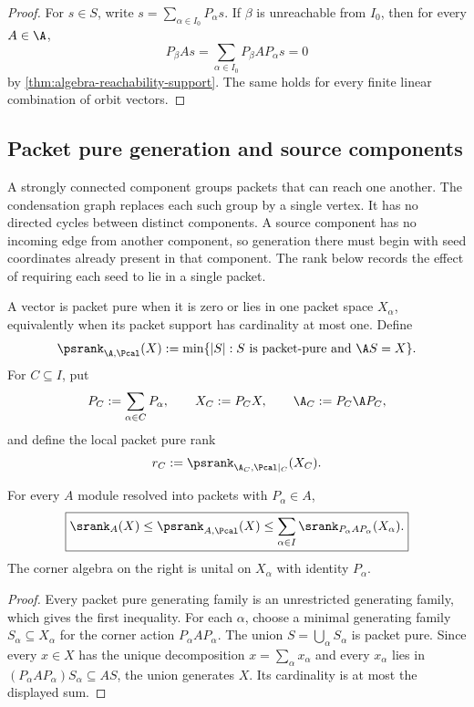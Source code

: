 \begin{proof}
For $s\in S$, write $s=\sum_{\alpha\in I_0}P_\alpha s$.  If $\beta$ is unreachable from $I_0$, then for every $A\in\A$,
\[
P_\beta As
=
\sum_{\alpha\in I_0}P_\beta AP_\alpha s
=0
\]
by \cref{thm:algebra-reachability-support}.  The same holds for every finite linear combination of orbit vectors.
\end{proof}

\subsection{Packet pure generation and source components}
A strongly connected component groups packets that can reach one another.  The condensation graph replaces each such group by a single vertex.  It has no directed cycles between distinct components.  A source component has no incoming edge from another component, so generation there must begin with seed coordinates already present in that component.  The rank below records the effect of requiring each seed to lie in a single packet.

\begin{definition}
\label{def:directed-seed-rank}
A vector is packet pure when it is zero or lies in one packet space $X_\alpha$, equivalently when its packet support has cardinality at most one.  Define
\[
\psrank_{\A,\Pcal}(X)
:=
\min\{|S|:S\text{ is packet-pure and }\A S=X\}.
\]
For $C\subseteq I$, put
\[
P_C:=\sum_{\alpha\in C}P_\alpha,
\qquad
X_C:=P_CX,
\qquad
\A_C:=P_C\A P_C,
\]
and define the local packet pure rank
\[
r_C:=\psrank_{\A_C,\Pcal|_C}(X_C).
\]
\end{definition}

\begin{proposition}
\label{prop:packet-pure-rank-bounds}
For every $A$ module resolved into packets with $P_\alpha\in A$,
\[
\boxed{
\srank_A(X)
\leq
\psrank_{A,\Pcal}(X)
\leq
\sum_{\alpha\in I}
\srank_{P_\alpha A P_\alpha}(X_\alpha).
}
\]
The corner algebra on the right is unital on $X_\alpha$ with identity $P_\alpha$.
\end{proposition}

\begin{proof}
Every packet pure generating family is an unrestricted generating family, which gives the first inequality.  For each $\alpha$, choose a minimal generating family $S_\alpha\subseteq X_\alpha$ for the corner action $P_\alpha A P_\alpha$.  The union $S=\bigcup_\alpha S_\alpha$ is packet pure.  Since every $x\in X$ has the unique decomposition $x=\sum_\alpha x_\alpha$ and every $x_\alpha$ lies in $(P_\alpha A P_\alpha)S_\alpha\subseteq AS$, the union generates $X$.  Its cardinality is at most the displayed sum.
\end{proof}

